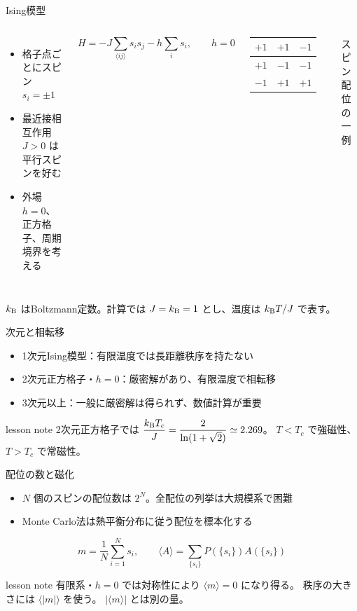 \documentclass[12pt,aspectratio=43]{beamer}
\newenvironment{lessonbox}
  {\begin{beamercolorbox}[wd=\linewidth,sep=1.5mm]{lesson note}}
  {\end{beamercolorbox}\par}
\begin{document}
\begin{frame}[t]{Ising模型}
  \begin{columns}[T,onlytextwidth]
    \begin{itemize}
      \setlength{\itemsep}{2mm}
      \item 格子点ごとにスピン $s_i=\pm1$
      \item 最近接相互作用 $J>0$ は平行スピンを好む
      \item 外場 $h=0$、正方格子、周期境界を考える
    \end{itemize}
    \[
      H=-J\sum_{\langle ij\rangle}s_i s_j
        -h\sum_i s_i,
      \qquad h=0
    \]
    \centering
    \renewcommand{\arraystretch}{1.6}
    \begin{tabular}{c|c|c}
      $+1$ & $+1$ & $-1$ \\
      \hline
      $+1$ & $-1$ & $-1$ \\
      \hline
      $-1$ & $+1$ & $+1$
    \end{tabular}
    \par\small スピン配位の一例
  \end{columns}
  \vspace{1mm}
  \small $k_{\rm B}$ はBoltzmann定数。計算では $J=k_{\rm B}=1$ とし、温度は $k_{\rm B}T/J$ で表す。
\end{frame}

\begin{frame}[t]{次元と相転移}
  \begin{itemize}
    \setlength{\itemsep}{3mm}
    \item 1次元Ising模型：有限温度では長距離秩序を持たない
    \item 2次元正方格子・$h=0$：厳密解があり、有限温度で相転移
    \item 3次元以上：一般に厳密解は得られず、数値計算が重要
  \end{itemize}
  \begin{lessonbox}
    2次元正方格子では
    $\displaystyle \frac{k_{\rm B}T_c}{J}
      =\frac{2}{\ln(1+\sqrt2)}\simeq2.269$。
    $T<T_c$ で強磁性、$T>T_c$ で常磁性。
  \end{lessonbox}
\end{frame}

\begin{frame}[t]{配位の数と磁化}
  \begin{itemize}
    \setlength{\itemsep}{2mm}
    \item $N$ 個のスピンの配位数は $2^N$。全配位の列挙は大規模系で困難
    \item Monte Carlo法は熱平衡分布に従う配位を標本化する
  \end{itemize}
  \[
    m=\frac{1}{N}\sum_{i=1}^{N}s_i,
    \qquad
    \langle A\rangle=\sum_{\{s_i\}} P(\{s_i\})A(\{s_i\})
  \]
  \begin{lessonbox}
    有限系・$h=0$ では対称性により $\langle m\rangle=0$ になり得る。
    秩序の大きさには $\langle|m|\rangle$ を使う。
    $|\langle m\rangle|$ とは別の量。
  \end{lessonbox}
\end{frame}
\end{document}
